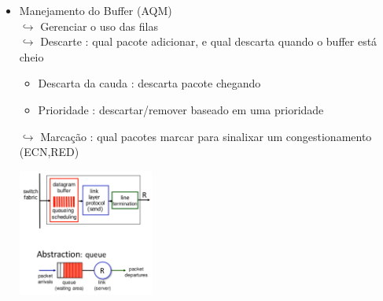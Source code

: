 \begin{itemize}[left=0.5cm, align=left, nosep]
                \item Manejamento do Buffer (AQM) \\
                     $\hookrightarrow$ Gerenciar o uso das filas \\
                     $\hookrightarrow$ Descarte : qual pacote adicionar, e qual descarta quando o buffer está cheio 
                        \begin{itemize}[left=0.5cm, align=left, nosep]
                            \item Descarta da cauda : descarta pacote chegando
                            \item Prioridade : descartar/remover baseado em uma prioridade 
                        \end{itemize}    
                    
                    $\hookrightarrow$ Marcação : qual pacotes marcar para sinalixar um congestionamento (ECN,RED)

                    \begin{center}
                        \includegraphics[width=0.35\textwidth]{img/cap-04/manejamento-buffer.png}
                    \end{center}
               
            \end{itemize}
            
